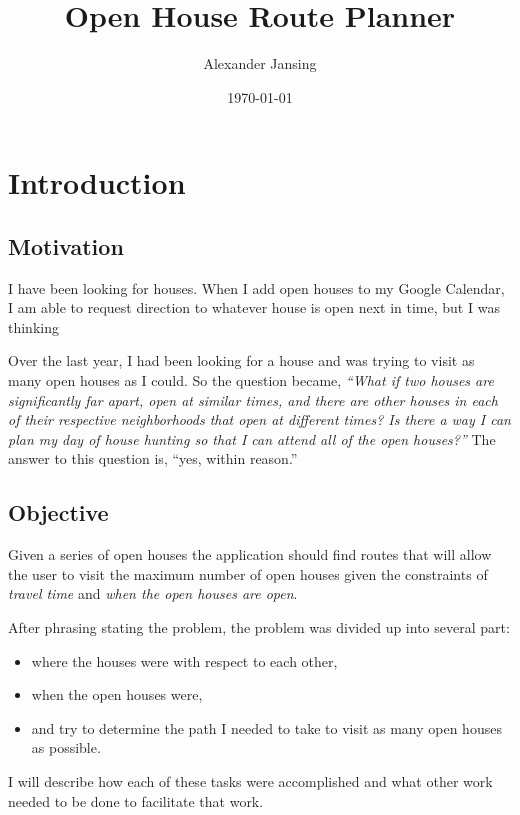 \documentclass[11 pt]{IEEEtran}
\title{Open House Route Planner}
\author{Alexander Jansing}
\date{\today}
\theoremstyle{definition}
\theoremstyle{definition}
\begin{document}
\maketitle

\section{Introduction}
\subsection{Motivation}
I have been looking for houses. When I add open houses to my Google Calendar, I am able to request direction to whatever house is open next in time, but I was thinking

Over the last year, I had been looking for a house and was trying to visit as many open houses as I could. So the question became, \emph{``What if two houses are significantly far apart, open at similar times, and there are other houses in each of their respective neighborhoods that open at different times? Is there a way I can plan my day of house hunting so that I can attend all of the open houses?''} The answer to this question is, ``yes, within reason.''

\subsection{Objective}
Given a series of open houses the application should find routes that will allow the user to visit the maximum number of open houses given the constraints of \emph{travel time} and \emph{when the open houses are open}.

After phrasing stating the problem, the problem was divided up into several part:
\begin{itemize}
  \item where the houses were with respect to each other,
  \item when the open houses were,
  \item and try to determine the path I needed to take to visit as many open houses as possible.
\end{itemize}

I will describe how each of these tasks were accomplished and what other work needed to be done to facilitate that work.

\end{document}
